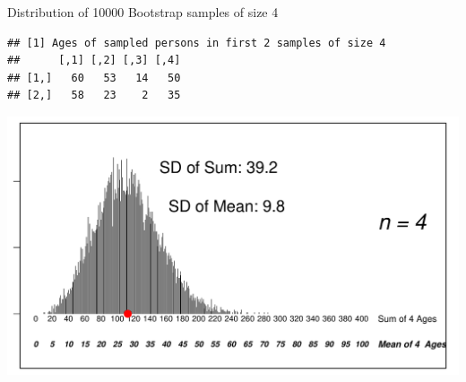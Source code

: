 \documentclass[10pt]{beamer}\usepackage[]{graphicx}\usepackage[]{color}
\makeatletter
\def\maxwidth{ %
  \ifdim\Gin@nat@width>\linewidth
    \linewidth
  \else
    \Gin@nat@width
  \fi
}
\newenvironment{kframe}{%
 \def\at@end@of@kframe{}%
 \ifinner\ifhmode%
  \def\at@end@of@kframe{\end{minipage}}%
  \begin{minipage}{\columnwidth}%
 \fi\fi%
 \def\FrameCommand##1{\hskip\@totalleftmargin \hskip-\fboxsep
 \colorbox{shadecolor}{##1}\hskip-\fboxsep
     \hskip-\linewidth \hskip-\@totalleftmargin \hskip\columnwidth}%
 \MakeFramed {\advance\hsize-\width
   \@totalleftmargin\z@ \linewidth\hsize
   \@setminipage}}%
 {\par\unskip\endMakeFramed%
 \at@end@of@kframe}
\newenvironment{knitrout}{}{} %
\makeatother
\begin{document}
\begin{frame}[fragile]{Distribution of 10000 Bootstrap samples of size 4}
\begin{knitrout}\tiny
{}\color{fgcolor}\begin{kframe}
\begin{verbatim}
## [1] Ages of sampled persons in first 2 samples of size 4
##      [,1] [,2] [,3] [,4]
## [1,]   60   53   14   50
## [2,]   58   23    2   35
\end{verbatim}
\end{kframe}

{\centering \includegraphics[width=\maxwidth]{figure/unnamed-chunk-3-1} 

}


\end{knitrout}
	
\end{frame}
\end{document}
